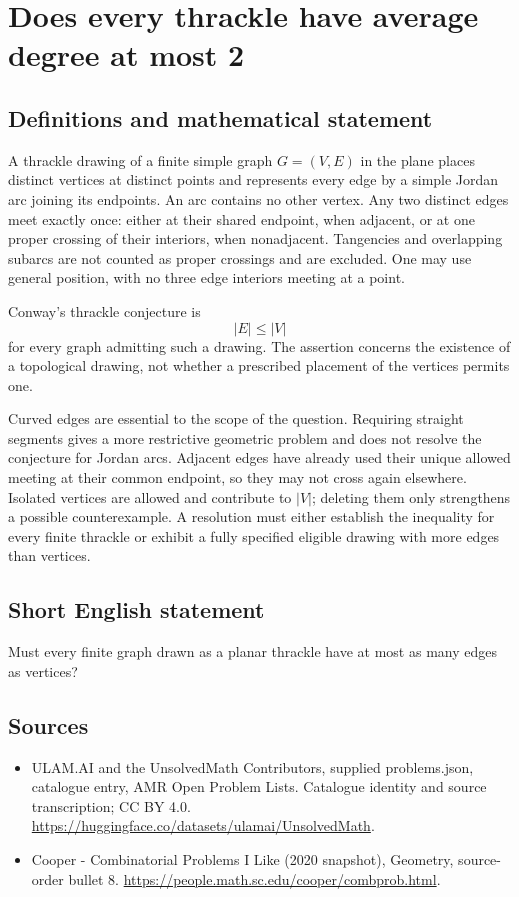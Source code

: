 \documentclass[11pt,a4paper]{article}
\begin{document}
\section*{Does every thrackle have average degree at most 2}\label{statement}

\subsection{Definitions and mathematical statement}
A thrackle drawing of a finite simple graph $G=(V,E)$ in the plane
places distinct vertices at distinct points and represents every
edge by a simple Jordan arc joining its endpoints. An arc contains
no other vertex. Any two distinct edges meet exactly once: either
at their shared endpoint, when adjacent, or at one proper crossing
of their interiors, when nonadjacent. Tangencies and overlapping
subarcs are not counted as proper crossings and are excluded.
One may use general position, with no three edge interiors meeting
at a point.

Conway's thrackle conjecture is
\[
                           |E|\le |V|
\]
for every graph admitting such a drawing. The assertion concerns
the existence of a topological drawing, not whether a prescribed
placement of the vertices permits one.

Curved edges are essential to the scope of the question. Requiring
straight segments gives a more restrictive geometric problem and
does not resolve the conjecture for Jordan arcs. Adjacent edges
have already used their unique allowed meeting at their common
endpoint, so they may not cross again elsewhere. Isolated vertices
are allowed and contribute to $|V|$; deleting them only strengthens
a possible counterexample. A resolution must either establish the
inequality for every finite thrackle or exhibit a fully specified
eligible drawing with more edges than vertices.
\subsection{Short English statement}
Must every finite graph drawn as a planar thrackle have at most as many edges as vertices?
\subsection{Sources}
\begin{itemize}
\item[S1] ULAM.AI and the UnsolvedMath Contributors, supplied problems.json, catalogue entry, AMR Open Problem Lists. Catalogue identity and source transcription; CC BY 4.0.
\url{https://huggingface.co/datasets/ulamai/UnsolvedMath}.
\item[S2] Cooper - Combinatorial Problems I Like (2020 snapshot), Geometry, source-order bullet 8. 
\url{https://people.math.sc.edu/cooper/combprob.html}.
\end{itemize}
\end{document}
